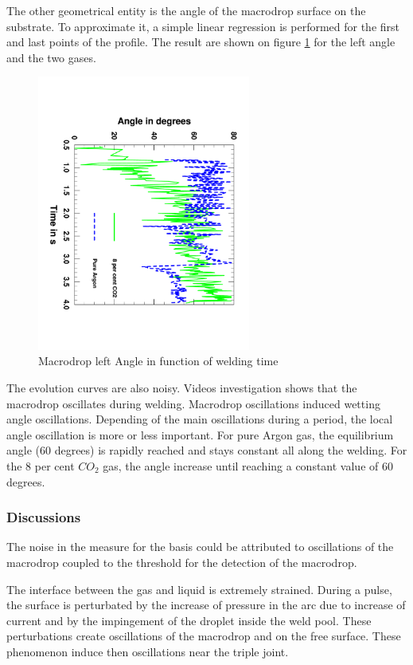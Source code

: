 \documentclass[12pt]{iopart}
\begin{document}
The other geometrical entity is the angle of the macrodrop surface on the substrate.
 To approximate it, a simple linear regression is
performed for the first and last points of the profile. The result are shown on figure \ref{fig::angles}
for the left angle and the two gases.

\begin{figure}[h!]
\centering    
\includegraphics[width=7cm,angle=90]{images/Evolution_Angle_Gazs.pdf}
\caption{Macrodrop left Angle in function of welding time}
\label{fig::angles}
\end{figure}

The evolution curves are also noisy. Videos investigation shows that the macrodrop oscillates during welding. 
Macrodrop oscillations induced  wetting angle oscillations. Depending of the main oscillations during
a period, the local angle oscillation is more or less important. For pure Argon
gas, the equilibrium angle (60 degrees) is rapidly reached and stays constant all along the welding.
For the 8 per cent $CO_2$ gas, the angle increase until reaching a constant value of 60 degrees.

\subsubsection{Discussions}
The noise in the measure for the basis could be attributed
to oscillations of the macrodrop coupled to the threshold for the detection of the macrodrop.

The interface between the gas and liquid is extremely strained. During a pulse, the surface is perturbated by the
increase of pressure in the arc due to increase of current and by the impingement of the droplet inside the
weld pool. These perturbations create oscillations of the macrodrop and on the free surface.
 These phenomenon induce then oscillations near the triple joint.
\end{document}
